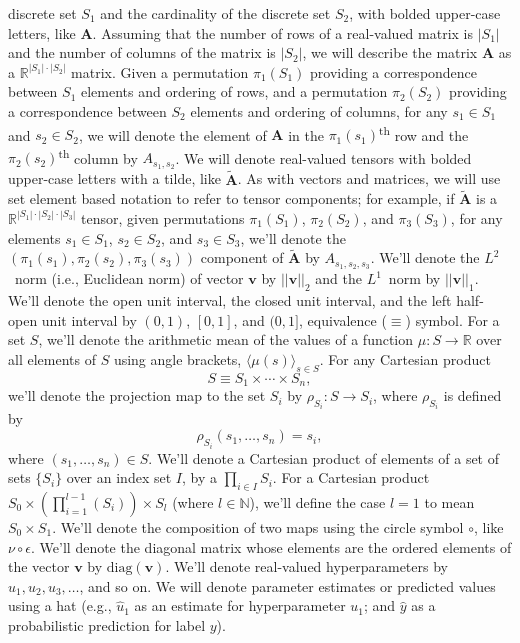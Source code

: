\documentclass[11pt,notitlepage,english]{article}
\begin{document}
discrete set $S_1$ and the cardinality of the discrete set $S_2$, with bolded
upper-case letters, like ${\boldsymbol A}$. Assuming that the number of rows of
a real-valued matrix is $|S_1|$ and the number of columns of the matrix is
$|S_2|$, we will describe the matrix $\boldsymbol{A}$ as a ${\mathbb
  R}^{|S_1|\cdot |S_2|}$ matrix.  Given a permutation $\pi_1(S_1)$ providing a
correspondence between $S_1$ elements and ordering of rows, and a permutation
$\pi_2(S_2)$ providing a correspondence between $S_2$ elements and ordering of
columns, for any $s_1 \in S_1$ and $s_2 \in S_2$, we will denote the element of
$\boldsymbol{A}$ in the $\pi_1(s_1)$\textsuperscript{th} row and the
$\pi_2(s_2)$\textsuperscript{th} column by $A_{s_1,s_2}$. We will denote
real-valued tensors with bolded upper-case letters with a tilde, like
$\widetilde{\boldsymbol A}$. As with vectors and matrices, we will use set
element based notation to refer to tensor components; for example, if
$\widetilde{\boldsymbol A}$ is a ${\mathbb R}^{|S_1|\cdot |S_2| \cdot |S_3|}$
tensor, given permutations $\pi_1(S_1)$, $\pi_2(S_2)$, and $\pi_3(S_3)$, for any
elements $s_1 \in S_1$, $s_2 \in S_2$, and $s_3 \in S_3$, we'll denote the
$(\pi_1(s_1), \pi_2(s_2), \pi_3(s_3))$ component of $\widetilde{\boldsymbol A}$
by $A_{s_1,s_2,s_3}$. We'll denote the $L^2$~norm (i.e., Euclidean norm) of
vector ${\boldsymbol v}$ by $||{\boldsymbol v}||_2$ and the $L^1$~norm by
$||{\boldsymbol v}||_1$. We'll denote the open unit interval, the closed unit
interval, and the left half-open unit interval by $(0,1)$, $[0,1]$, and $(0,1]$,
  equivalence ($\equiv$) symbol.  For a set $S$, we'll denote the arithmetic
  mean of the values of a function $\mu: S \rightarrow {\mathbb R}$ over all
  elements of $S$ using angle brackets, $\langle \mu(s) \rangle_{s \in S}$. For
  any Cartesian product
\begin{equation}
  S \equiv S_1 \times \cdots \times S_n,
\end{equation}
we'll denote the projection map to the set $S_i$ by $\rho_{S_i}:S\rightarrow S_i$, where $\rho_{S_i}$ is defined by
\begin{equation}
\rho_{S_i}(s_1, \ldots, s_n) = s_i,
\end{equation}
where $(s_1, \ldots, s_n) \in S$. We'll denote a Cartesian product of elements
of a set of sets $\{S_i\}$ over an index set $I$, by a $\prod_{i \in I} S_i$.
For a Cartesian product $S_0 \times {( \prod_{i=1}^{l-1}{(S_i )})} \times S_l$
(where $l \in {\mathbb N}$), we'll define the case $l = 1$ to mean $S_0 \times
S_1$.  We'll denote the composition of two maps using the circle symbol $\circ$,
like $\nu \circ \epsilon$.  We'll denote the diagonal matrix whose elements are
the ordered elements of the vector ${\boldsymbol v}$ by
$\textrm{diag}({\boldsymbol v})$. We'll denote real-valued hyperparameters by
$u_1, u_2, u_3, \ldots$, and so on. We will denote parameter estimates or
predicted values using a hat (e.g., $\widehat{u}_1$ as an estimate for
hyperparameter $u_1$; and $\widehat{y}$ as a probabilistic prediction for label $y$).
\end{document}
